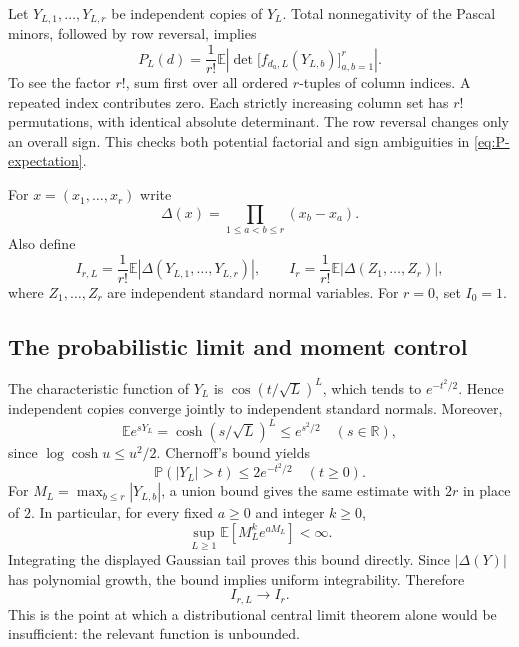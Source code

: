 \documentclass[11pt]{article}
\numberwithin{equation}{section}
\theoremstyle{definition}
\newcommand{\RR}{\mathbb{R}}
\newcommand{\EE}{\mathbb{E}}
\newcommand{\PP}{\mathbb{P}}
\newcommand{\vander}{\Delta}
\begin{document}
Let $Y_{L,1},\ldots,Y_{L,r}$ be independent copies of $Y_L$. Total nonnegativity of the Pascal minors, followed by row reversal, implies
\begin{equation}\label{eq:P-expectation}
 P_L(d)=\frac1{r!}\EE\left|
       \det\bigl[f_{d_a,L}(Y_{L,b})\bigr]_{a,b=1}^r\right|.
\end{equation}
To see the factor $r!$, sum first over all ordered $r$-tuples of column indices. A repeated index contributes zero. Each strictly increasing column set has $r!$ permutations, with identical absolute determinant. The row reversal changes only an overall sign. This checks both potential factorial and sign ambiguities in \eqref{eq:P-expectation}.

For $x=(x_1,\ldots,x_r)$ write
\[
 \vander(x)=\prod_{1\leq a<b\leq r}(x_b-x_a).
\]
Also define
\begin{equation}\label{eq:I-L}
 I_{r,L}=\frac1{r!}\EE|\vander(Y_{L,1},\ldots,Y_{L,r})|,
 \qquad I_r=\frac1{r!}\EE|\vander(Z_1,\ldots,Z_r)|,
\end{equation}
where $Z_1,\ldots,Z_r$ are independent standard normal variables. For $r=0$, set $I_0=1$.

\subsection{The probabilistic limit and moment control}
The characteristic function of $Y_L$ is $\cos(t/\sqrt L)^L$, which tends to $e^{-t^2/2}$. Hence independent copies converge jointly to independent standard normals. Moreover,
\begin{equation}\label{eq:subgaussian}
 \EE e^{sY_L}=\cosh(s/\sqrt L)^L\leq e^{s^2/2}\quad(s\in\RR),
\end{equation}
since $\log\cosh u\leq u^2/2$. Chernoff's bound yields
\[
 \PP(|Y_L|>t)\leq2e^{-t^2/2}\quad(t\geq0).
\]
For $M_L=\max_{b\leq r}|Y_{L,b}|$, a union bound gives the same estimate with $2r$ in place of $2$. In particular, for every fixed $a\geq0$ and integer $k\geq0$,
\begin{equation}\label{eq:uniformmoments}
 \sup_{L\geq1}\EE[M_L^k e^{aM_L}]<\infty.
\end{equation}
Integrating the displayed Gaussian tail proves this bound directly. Since $|\vander(Y)|$ has polynomial growth, the bound implies uniform integrability. Therefore
\begin{equation}\label{eq:I-convergence}
 I_{r,L}\longrightarrow I_r.
\end{equation}
This is the point at which a distributional central limit theorem alone would be insufficient: the relevant function is unbounded.
\end{document}
